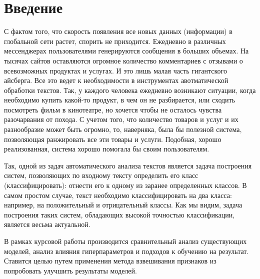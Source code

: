 \chapter*{Введение}
С фактом того, что скорость появления все новых данных (информации) в глобальной сети растет, спорить не приходится. Ежедневно в различных мессенджерах пользователями генерируются сообщения в больших объемах. На тысячах сайтов оставляются огромное количество комментариев с отзывами о всевозможных продуктах и услугах. И это лишь малая часть гигантского айсберга. Все это ведет к необходимости в инструментах авотматической обработки текстов. Так, у каждого человека ежедневно возникают ситуации, когда необходимо купить какой-то продукт, в чем он не разбирается, или сходить посмотреть фильм в кинотеатре, но хочется чтобы не осталось чувства разочарвания от похода. С учетом того, что количество товаров и услуг и их разнообразие может быть огромно, то, наверняка, была бы полезной система, позволяющая ранжировать все эти товары и услуги. Подобная, хорошо реализованная, система хорошо помогала бы своим пользователям.

Так, одной из задач автоматического анализа текстов является задача построения систем, позволяющих по входному тексту определить его класс (классифицировать): отнести его к одному из заранее определенных классов. В самом простом случае, текст необходимо классифицировать на два класса: например, на положительный и отрицательный классы. Как мы видим, задача построения таких систем, обладающих высокой точностью классификации, является весьма актуальной.

В рамках курсовой работы производится сравнительный анализ существующих моделей, анализ влияния гиперпараметров и подходов к обучению на результат. Ставится целью путем применения метода взвешивания признаков из \cite{nbsvm} попробовать улучшить результаты моделей.